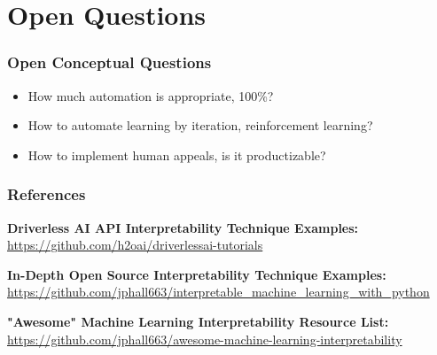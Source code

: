 \documentclass[11pt,
               aspectratio=169,
               hyperref={colorlinks}
               ]{beamer}
\begin{document}
	\section{Open Questions}

		\begin{frame}

			\frametitle{Open Conceptual Questions}		

			\begin{itemize}
				\item How much automation is appropriate, 100\%?
				\item How to automate learning by iteration, reinforcement learning?
				\item How to implement human appeals, is it productizable?
			\end{itemize}
			
		\end{frame}


	\begin{frame}[t, allowframebreaks]
	
		\frametitle{References}
		
			\vspace{10pt}		
		
			\textbf{Driverless AI API Interpretability Technique Examples:}\\
			\small{\url{https://github.com/h2oai/driverlessai-tutorials}}
			
			\vspace{10pt}		
		
		
			\textbf{In-Depth Open Source Interpretability Technique Examples:}\\
			\small{\url{https://github.com/jphall663/interpretable_machine_learning_with_python}}
			
			\vspace{10pt}
			
			\textbf{"Awesome" Machine Learning Interpretability Resource List:}\\
			\small{\url{https://github.com/jphall663/awesome-machine-learning-interpretability}}
			
		
		\framebreak		
		
		\printbibliography
		
	\end{frame}
\end{document}

